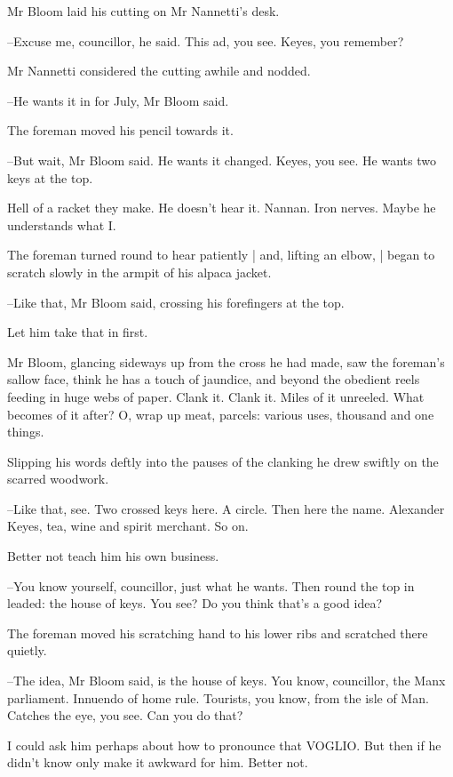 
Mr Bloom laid his cutting on Mr Nannetti's desk.

--Excuse me, councillor,
he said.
This ad, you see.
Keyes, you remember?

Mr Nannetti considered the cutting awhile and nodded.

--He wants it in for July,
Mr Bloom said.

The foreman moved his pencil towards it.

--But wait,
Mr Bloom said.
He wants it changed.
Keyes, you see.
He wants two keys at the top.

Hell of a racket they make.
He doesn't hear it.
Nannan.
Iron nerves.
Maybe he understands what I.

The foreman turned round to hear patiently |
and, lifting an elbow, |
began to scratch slowly in the armpit of his alpaca jacket.

--Like that,
Mr Bloom said,
crossing his forefingers at the top.

Let him take that in first.

Mr Bloom,
glancing sideways up from the cross he had made,
saw the foreman's sallow face,
think he has a touch of jaundice,
and beyond
the obedient reels feeding in huge webs of paper.
Clank it.
Clank it.
Miles of it unreeled.
What becomes of it after?
O, wrap up meat, parcels:
various uses,
thousand and one things.

Slipping his words deftly into the pauses of the clanking
he drew swiftly on the scarred woodwork.



--Like that, see.
Two crossed keys here.
A circle.
Then here the name.
Alexander Keyes,
tea, wine and spirit merchant.
So on.

Better not teach him his own business.

--You know yourself, councillor,
just what he wants.
Then round the top in leaded:
the house of keys.
You see?
Do you think that's a good idea?

The foreman moved his scratching hand to his lower ribs
and scratched there quietly.

--The idea,
Mr Bloom said,
is the house of keys.
You know, councillor,
the Manx parliament.
Innuendo of home rule.
Tourists, you know, from the isle of Man.
Catches the eye, you see.
Can you do that?

I could ask him perhaps about how to pronounce that VOGLIO.
But then if he didn't know
only make it awkward for him.
Better not.

